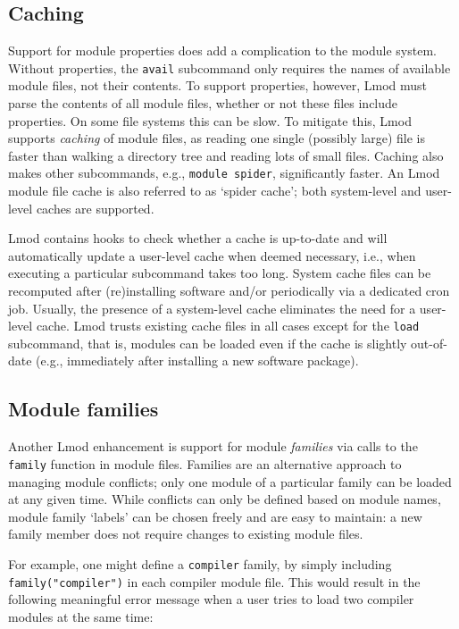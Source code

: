 \subsection{Caching}

Support for module properties does add a complication to the module
system.  Without properties, the \texttt{\small avail} subcommand only requires the
names of available module files, not their contents.  To support properties, however, Lmod
must parse the contents of all module files, whether or not these files include
properties. On some file systems this can be slow.  To mitigate this, Lmod supports
\emph{caching} of module files, as reading one single (possibly large)
file is faster than walking a directory tree and reading lots of small files.
Caching also makes other subcommands, e.g., \texttt{\small module spider},
significantly faster. An Lmod module file cache is also referred to as
`spider cache'; both system-level and user-level caches are supported.

Lmod contains hooks to check whether a cache is up-to-date and will automatically
update a user-level cache when deemed necessary, i.e., when executing a particular
subcommand takes too long. System cache files can be recomputed after (re)installing 
software and/or periodically via a dedicated cron job. Usually, the presence of a
system-level cache eliminates the need for a user-level cache. Lmod trusts existing
cache files in all cases except for the \texttt{\small load} subcommand, that is,
modules can be loaded even if the cache is slightly out-of-date
(e.g., immediately after installing a new software package).


\subsection{Module families}

Another Lmod enhancement is support for module
\emph{families} via calls to the \texttt{\small family} function in module files.
Families are an alternative approach to managing module conflicts; only one module of
a particular family can be loaded at any given time. While conflicts can only be
defined based on module names, module family `labels' can be chosen freely and
are easy to maintain: a new family member does not require changes to existing
module files.

For example, one might define a \texttt{\small compiler} family, by
simply including \texttt{\small family("compiler")} in each compiler module file.
This would result in the following meaningful error message when a user tries to
load two compiler modules at the same time:

